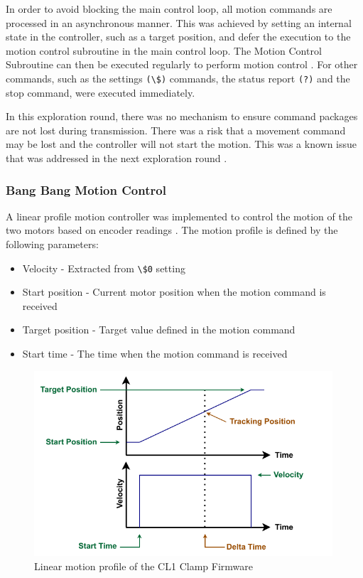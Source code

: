 In order to avoid blocking the main control loop, all motion commands are processed in an asynchronous manner. This was achieved by setting an internal state in the controller, such as a target position, and defer the execution to the motion control subroutine in the main control loop. The Motion Control Subroutine can then be executed regularly to perform motion control . For other commands, such as the settings \verb|(\$)| commands, the status report \verb|(?)| and the stop command, were executed immediately.

In this exploration round, there was no mechanism to ensure command packages are not lost during transmission. There was a risk that a movement command may be lost and the controller will not start the motion. This was a known issue that was addressed in the next exploration round .

\FloatBarrier

\subsubsection{Bang Bang Motion Control}
\label{subsubsection:exploration-1-bang-bang-motion-control}



A linear profile motion controller was implemented to control the motion of the two motors based on encoder readings \parencite{tanPrecisionMotionControl2001}. The motion profile is defined by the following parameters:

\begin{itemize} [nosep]
    \item Velocity - Extracted from \verb|\$0| setting
    \item Start position - Current motor position when the motion command is received
    \item Target position - Target value defined in the motion command
    \item Start time - The time when the motion command is received
\end{itemize}

\begin{figure}[h]
    \centering
    \includegraphics[width=0.99\textwidth]{images/04-3/firmware-motion-control.pdf}
    \caption{Linear motion profile of the CL1 Clamp Firmware}
    \label{fig:linear-motion-profile}
\end{figure}

